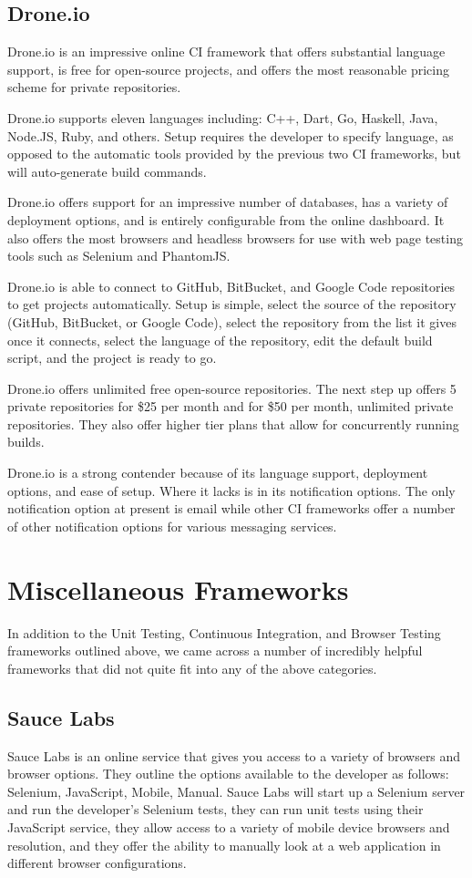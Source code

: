 \documentclass[12pt]{ucthesis}
\begin{document}
\subsection{Drone.io}
Drone.io\cite{DroneIO} is an impressive online CI framework that offers substantial language support, is free for open-source projects, and offers the most reasonable pricing scheme for private repositories.

Drone.io supports eleven languages including: C++, Dart, Go, Haskell, Java, Node.JS, Ruby, and others. Setup requires the developer to specify language, as opposed to the automatic tools provided by the previous two CI frameworks, but will auto-generate build commands.

Drone.io offers support for an impressive number of databases, has a variety of deployment options, and is entirely configurable from the online dashboard. It also offers the most browsers and headless browsers for use with web page testing tools such as Selenium and PhantomJS.

Drone.io is able to connect to GitHub, BitBucket, and Google Code repositories to get projects automatically. Setup is simple, select the source of the repository (GitHub, BitBucket, or Google Code), select the repository from the list it gives once it connects, select the language of the repository, edit the default build script, and the project is ready to go.

Drone.io offers unlimited free open-source repositories. The next step up offers 5 private repositories for \$25 per month and for \$50 per month, unlimited private repositories. They also offer higher tier plans that allow for concurrently running builds.

Drone.io is a strong contender because of its language support, deployment options, and ease of setup. Where it lacks is in its notification options. The only notification option at present is email while other CI frameworks offer a number of other notification options for various messaging services.


\section{Miscellaneous Frameworks}
In addition to the Unit Testing, Continuous Integration, and Browser Testing frameworks outlined above, we came across a number of incredibly helpful frameworks that did not quite fit into any of the above categories.

\subsection{Sauce Labs}
Sauce Labs\cite{SauceLabs} is an online service that gives you access to a variety of browsers and browser options. They outline the options available to the developer as follows: Selenium, JavaScript, Mobile, Manual. Sauce Labs will start up a Selenium server and run the developer's Selenium tests, they can run unit tests using their JavaScript service, they allow access to a variety of mobile device browsers and resolution, and they offer the ability to manually look at a web application in different browser configurations.
\end{document}
